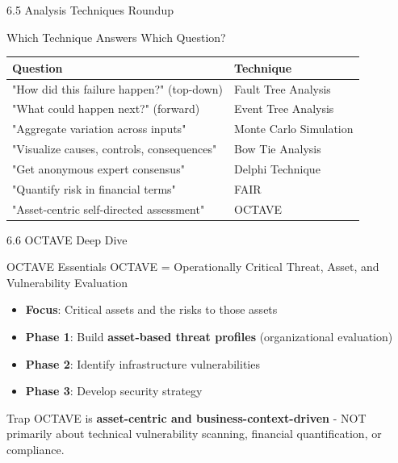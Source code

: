 \documentclass{beamer}
\begin{document}
	\begin{frame}{6.5 Analysis Techniques Roundup}
		\begin{block}{Which Technique Answers Which Question?}
			\begin{tabular}{|p{4.5cm}|p{5cm}|}
				\hline
				\textbf{Question} & \textbf{Technique} \\
				\hline
				"How did this failure happen?" (top-down) & Fault Tree Analysis \\
				\hline
				"What could happen next?" (forward) & Event Tree Analysis \\
				\hline
				"Aggregate variation across inputs" & Monte Carlo Simulation \\
				\hline
				"Visualize causes, controls, consequences" & Bow Tie Analysis \\
				\hline
				"Get anonymous expert consensus" & Delphi Technique \\
				\hline
				"Quantify risk in financial terms" & FAIR \\
				\hline
				"Asset-centric self-directed assessment" & OCTAVE \\
				\hline
			\end{tabular}
		\end{block}
	\end{frame}
	
	\begin{frame}{6.6 OCTAVE Deep Dive}
		\begin{block}{OCTAVE Essentials}
			OCTAVE = Operationally Critical Threat, Asset, and Vulnerability Evaluation
		\end{block}
		
		\begin{itemize}
			\item \textbf{Focus}: Critical assets and the risks to those assets
			\item \textbf{Phase 1}: Build \textbf{asset-based threat profiles} (organizational evaluation)
			\item \textbf{Phase 2}: Identify infrastructure vulnerabilities
			\item \textbf{Phase 3}: Develop security strategy
		\end{itemize}
		
		\begin{alertblock}{Trap}
			OCTAVE is \textbf{asset-centric and business-context-driven} - NOT primarily about technical vulnerability scanning, financial quantification, or compliance.
		\end{alertblock}
	\end{frame}
	
\end{document}
